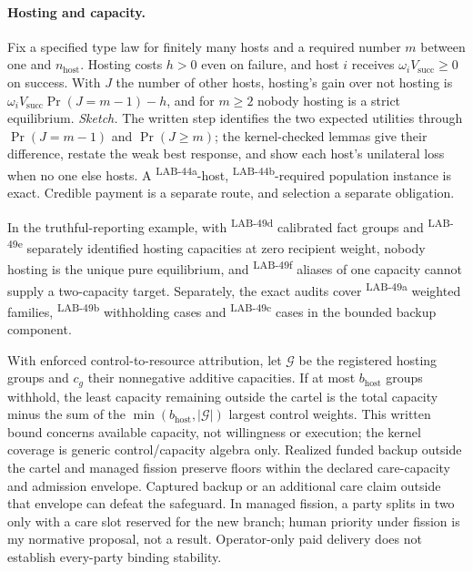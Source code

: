 \documentclass[pdflatex,sn-basic]{sn-jnl}%
\newcommand{\rec}[1]{\ifannotated\textsuperscript{\textcolor{blue!60!black}{\tiny#1}}\fi}
\begin{document}
\begin{appendices}
\paragraph{Hosting and capacity.} Fix a specified type law for finitely many hosts and a required number $m$ between one and $n_{\mathrm{host}}$. Hosting costs $h>0$ even on failure, and host $i$ receives $\omega_iV_{\mathrm{succ}}\ge0$ on success. With $J$ the number of other hosts, hosting's gain over not hosting is $\omega_iV_{\mathrm{succ}}\Pr(J=m-1)-h$, and for $m\ge2$ nobody hosting is a strict equilibrium. \emph{Sketch.} The written step identifies the two expected utilities through $\Pr(J=m-1)$ and $\Pr(J\ge m)$; the kernel-checked lemmas give their difference, restate the weak best response, and show each host's unilateral loss when no one else hosts. A \numDTenHosts\rec{LAB-44a}-host, \numDTenRequired\rec{LAB-44b}-required population instance is exact. Credible payment is a separate route, and selection a separate obligation.

In the truthful-reporting example, with \numDSixteenFactGroups\rec{LAB-49d} calibrated fact groups and \numDSixteenCapacities\rec{LAB-49e} separately identified hosting capacities at zero recipient weight, nobody hosting is the unique pure equilibrium, and \numDSixteenAliases\rec{LAB-49f} aliases of one capacity cannot supply a two-capacity target. Separately, the exact audits cover \numDSixteenFamilies\rec{LAB-49a} weighted families, \numDSixteenCartelCases\rec{LAB-49b} withholding cases and \numDSixteenCoalitionCases\rec{LAB-49c} cases in the bounded backup component.

With enforced control-to-resource attribution, let $\mathcal G$ be the registered hosting groups and $c_g$ their nonnegative additive capacities. If at most $b_{\mathrm{host}}$ groups withhold, the least capacity remaining outside the cartel is the total capacity minus the sum of the $\min(b_{\mathrm{host}},|\mathcal G|)$ largest control weights. This written bound concerns available capacity, not willingness or execution; the kernel coverage is generic control/capacity algebra only. Realized funded backup outside the cartel and managed fission preserve floors within the declared care-capacity and admission envelope. Captured backup or an additional care claim outside that envelope can defeat the safeguard. In managed fission, a party splits in two only with a care slot reserved for the new branch; human priority under fission is my normative proposal, not a result. Operator-only paid delivery does not establish every-party binding stability.


\end{appendices}
\end{document}
